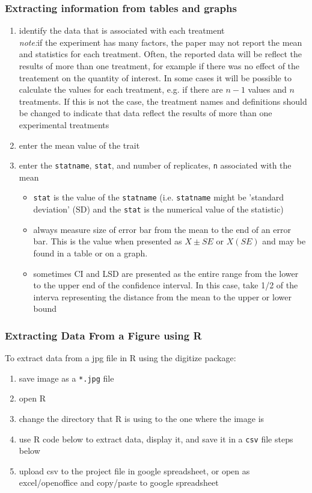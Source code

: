 \documentclass[12pt,english,portrait]{article}
\begin{document}
\subsubsection{Extracting information from tables and graphs}
\begin{enumerate}
\item identify the data that is associated with each treatment\\

  \textit{note:}\small{if the experiment has many factors, the paper may not report the mean and statistics for each treatment. Often, the reported data will be reflect the results of more than one treatment, for example if there was no effect of the treatement on the quantity of interest. In some cases it will be possible to calculate the values for each treatment, e.g. if there are $n-1$ values and $n$ treatments. If this is not the case, the treatment names and definitions should be changed to indicate that data reflect the results of more than one experimental treatments}
\item enter the mean value of the trait
\item enter the \verb+statname+, \verb+stat+, and number of replicates, \verb+n+ associated with the mean 
  \begin{itemize}
  \item \verb+stat+ is the value of the \verb+statname+ (i.e. \verb+statname+ might be 'standard
    deviation' (SD) and the \verb+stat+ is the numerical value of the statistic) 
  \item always measure size of error bar from the mean to the end of an error bar. This is
    the value when presented as $X\pm SE$ or $X(SE)$ and may be found in a table or
    on a graph. 
  \item sometimes CI and LSD are presented as the entire range from the lower to the upper end of the confidence interval. In this case, take 1/2 of the interva representing the distance from the mean to the upper or lower bound 
  \end{itemize}
\end{enumerate}

\subsubsection{Extracting Data From a Figure using R}

To extract data from a jpg file in R using the digitize package:

\begin{enumerate}
\item save image as a \verb+*.jpg+ file
\item open R
\item change the directory that R is using to the one where the image is
\item use R code below to extract data, display it, and save it in a \verb+csv+ file steps below  
\item upload csv to the project file in google spreadsheet, or open as excel/openoffice and copy/paste to google spreadsheet 
\end{enumerate}
\end{document}
